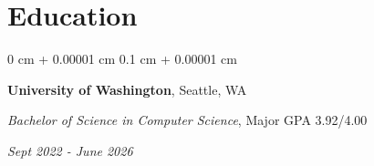 \documentclass[10pt, letterpaper]{article}
\newenvironment{highlightsforbulletentries}{
    \begin{itemize}[
        topsep=0.10 cm,
        parsep=0.10 cm,
        partopsep=0pt,
        itemsep=0pt,
        leftmargin=10pt
    ]
}{
    \end{itemize}
} %
\newenvironment{onecolentry}{
    \begin{adjustwidth}{
        0 cm + 0.00001 cm
    }{
        0.1 cm + 0.00001 cm
    }
}{
    \end{adjustwidth}
} %
\newenvironment{twocolentry}[2][]{
    \onecolentry
    \def\secondColumn{#2}
    \setcolumnwidth{\fill, 4.5 cm}
    \begin{paracol}{2}
}{
    \switchcolumn \raggedleft \secondColumn
    \end{paracol}
    \endonecolentry
} %
\let\hrefWithoutArrow\href
\renewcommand{\href}[2]{\hrefWithoutArrow{#1}{\ifthenelse{\equal{#2}{}}{ }{#2 }\raisebox{.15ex}{\footnotesize \faExternalLink*}}}
\begin{document}

    









    \section{Education}



        
        \begin{twocolentry}{
            
            
        \textit{Sept 2022 - June 2026}}
            \textbf{University of Washington}, Seattle, WA

            \textit{Bachelor of Science in Computer Science}, Major GPA 3.92/4.00
        \end{twocolentry}
\end{document}
